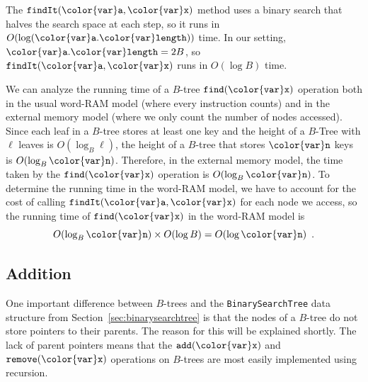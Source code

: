 \documentclass[10pt]{book}
\newcommand{\secref}[1]{Section~\ref{sec:#1}}
\theoremstyle{plain}
\theoremstyle{definition}
\begin{document}
The \ensuremath{\mathtt{findIt({\color{var}a},{\color{var}x})}} method uses a binary search 
%
that halves the search
space at each step, so it runs in $O(\log(\ensuremath{\mathtt{{\color{var}a}.{\color{var}length}}}))$ time.  In our setting, $\ensuremath{\mathtt{{\color{var}a}.{\color{var}length}}}=2B$, so \ensuremath{\mathtt{findIt({\color{var}a},{\color{var}x})}} runs in $O(\log B)$ time.

We can analyze the running time of a $B$-tree \ensuremath{\mathtt{find({\color{var}x})}} operation both
in the usual word-RAM model (where every instruction counts) and in the
external memory model (where we only count the number of nodes accessed).
Since each leaf in a $B$-tree stores at least one key and the height
of a $B$-Tree with $\ell$ leaves is $O(\log_B\ell)$, the height of a
$B$-tree that stores \ensuremath{\mathtt{{\color{var}n}}} keys is $O(\log_B \ensuremath{\mathtt{{\color{var}n}}})$.  Therefore, in the
external memory model, the time taken by the \ensuremath{\mathtt{find({\color{var}x})}} operation is
$O(\log_B \ensuremath{\mathtt{{\color{var}n}}})$.  To determine the running time in the word-RAM model,
we have to account for the cost of calling \ensuremath{\mathtt{findIt({\color{var}a},{\color{var}x})}} for each node
we access, so the running time of \ensuremath{\mathtt{find({\color{var}x})}} in the word-RAM model is
\[
   O(\log_B \ensuremath{\mathtt{{\color{var}n}}})\times O(\log B) = O(\log \ensuremath{\mathtt{{\color{var}n}}}) \enspace .
\]

\subsection{Addition}

One important difference between $B$-trees and the \texttt{BinarySearchTree}
data structure from \secref{binarysearchtree} is that the nodes of a
$B$-tree do not store pointers to their parents.  The reason for this
will be explained shortly.  The lack of parent pointers means that
the \ensuremath{\mathtt{add({\color{var}x})}} and \ensuremath{\mathtt{remove({\color{var}x})}} operations on $B$-trees are most easily
implemented using recursion.
\end{document}
